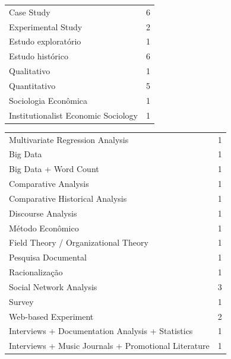 \documentclass[a4paper, 12pt, openright, oneside, german, french, english, brazil]{abntex2}
\begin{document}
			\begin{table}[ht]
				{\begin{tabular}{lr}
					\hline
					\hline
					Case Study &   6 \\
					Experimental Study &   2 \\
					Estudo exploratório &   1 \\
					Estudo histórico &   6 \\
					Qualitativo &   1 \\
					Quantitativo &   5 \\
					Sociologia Econômica &   1 \\
					Institutionalist Economic Sociology &   1 \\
					\hline
					\end{tabular}
				}
				{}
			\end{table}







					\begin{table}[ht]
						{\begin{tabular}{lr}
							\hline
							\hline
							Multivariate Regression Analysis &   1 \\
							Big Data &   1 \\
							Big Data + Word Count &   1 \\
							Comparative Analysis &   1 \\
							Comparative Historical Analysis &   1 \\
							Discourse Analysis &   1 \\
							Método Econômico &   1 \\
							Field Theory / Organizational Theory &   1 \\
							Pesquisa Documental &   1 \\
							Racionalização &   1 \\
							Social Network Analysis &   3 \\
							Survey &   1 \\
							Web-based Experiment &   2 \\
							Interviews + Documentation Analysis + Statistics  &  1 \\
							Interviews + Music Journals + Promotional Literature &   1 \\
							\hline
						\end{tabular}
					}
					{}
					\end{table}
\end{document}
